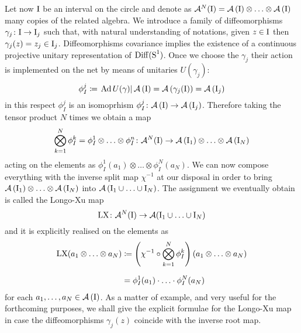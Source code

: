 \bigskip 
 Let now $\textrm{I}$ be an interval on the circle and
 denote as $\mathcal{A}^N(\textrm{I})=\mathcal{A}\left(\textrm{I}\right)\otimes\ldots 
 \otimes\mathcal{A}\left(\textrm{I}\right)$ many copies of the related algebra.
 We introduce a family of diffeomorphisms 
 $\gamma_j\colon\textrm{I}\to\textrm{I}_j$ such that, with natural 
 understanding of notations, given $z\in\textrm{I}$ then 
 $\gamma_j(z)=z_j\in \textrm{I}_j$. Diffeomorphisms covariance
 implies the existence of a continuous 
 projective unitary representation of $\operatorname{Diff}(\textrm{S}^1)$.
 Once we choose the $\gamma_j$ their action 
 is implemented on the net by means of unitaries 
 $U(\gamma_j)$:
 \[
 \phi^j_I\coloneqq\left.\operatorname{Ad} U(\gamma)\right|\mathcal{A}\left(\textrm{I}\right)=
 \mathcal{A}\left(\gamma_j(\textrm{I})\right)=\mathcal{A}\left(\textrm{I}_j\right)
 \]
 in this respect $\phi^j_I$ is an isomoprhism 
 $\phi^j_I\colon\mathcal{A}\left(\textrm{I}\right)\to\mathcal{A}\left(\textrm{I}_j\right)$. Therefore 
 taking the tensor product $N$ times we obtain a map
 \[
 \bigotimes_{k=1}^N \phi_I^k=\phi_I^1\otimes\ldots\otimes
 \phi_I^n\colon\mathcal{A}^N(\textrm{I})\to\mathcal{A}\left(\textrm{I}_1\right)\otimes
 \ldots\otimes\mathcal{A}\left(\textrm{I}_N\right)
 \]
 acting on the elements as $\phi_I^1(a_1)\otimes\ldots\otimes 
 \phi_I^N(a_N)$. We can now compose everything with 
 the inverse split map $\chi^{-1}$ at our disposal 
 in order to bring $\mathcal{A}\left(\textrm{I}_1\right)\otimes\ldots\otimes\mathcal{A}\left(\textrm{I}_N\right)$ 
 into $\mathcal{A}\left(\textrm{I}_1\cup\ldots\cup\textrm{I}_N\right)$. The assignment we 
 eventually obtain is called the Longo-Xu map 
 \begin{equation}
 \label{L-X}
 \textrm{LX}\colon\mathcal{A}^N(\textrm{I})\to\mathcal{A}
 (\textrm{I}_1\cup\ldots \cup\textrm{I}_N)
 \end{equation}
 and it is explicitly realised on the elements as
 \begin{align*}
 \textrm{LX}(a_1\otimes\ldots\otimes a_N)&\coloneqq
 \left(\chi^{-1}\circ\bigotimes_{k=1}^N \phi_I^k\right)
 (a_1\otimes\ldots\otimes a_N)\\[1.5ex]
 &=\phi_I^1(a_1)\cdot\ldots\cdot\phi_I^N(a_N) 
 \end{align*}
 for each $a_1,\ldots,a_N\in\mathcal{A}\left(\textrm{I}\right)$. As a matter
 of example, and very useful for the forthcoming
 purposes, we shall give the explicit formulae
 for the Longo-Xu map in case the diffeomorphisms
 $\gamma_j(z)$ coincide with the inverse root map.
